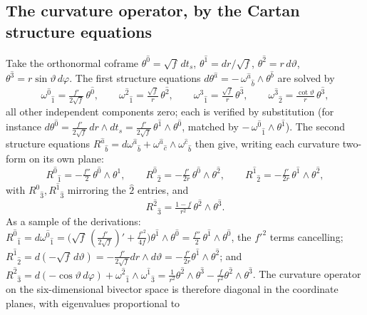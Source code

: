 \documentclass[11pt]{article}
\theoremstyle{definition}
\theoremstyle{plain}
\begin{document}
\subsection*{The curvature operator, by the Cartan structure equations}
\label{c:note.singularity.setting-curvature-operator-cartan-structure-equations}
Take the orthonormal coframe $\theta^{\hat 0} = \sqrt f\,dt_s$, $\theta^{\hat 1} = dr/\sqrt f$, $\theta^{\hat 2} = r\,d\vartheta$, $\theta^{\hat 3} = r\sin\vartheta\,d\varphi$. The first structure equations $d\theta^{\hat a} = -\,\omega^{\hat a}{}_{\hat b} \wedge \theta^{\hat b}$ are solved by
\[
\omega^{\hat 0}{}_{\hat 1} = \tfrac{f'}{2\sqrt f}\,\theta^{\hat 0}, \qquad
\omega^{\hat 2}{}_{\hat 1} = \tfrac{\sqrt f}{r}\,\theta^{\hat 2}, \qquad
\omega^{\hat 3}{}_{\hat 1} = \tfrac{\sqrt f}{r}\,\theta^{\hat 3}, \qquad
\omega^{\hat 3}{}_{\hat 2} = \tfrac{\cot\vartheta}{r}\,\theta^{\hat 3},
\]
all other independent components zero; each is verified by substitution (for instance $d\theta^{\hat 0} = \tfrac{f'}{2\sqrt f}\,dr \wedge dt_s = \tfrac{f'}{2\sqrt f}\,\theta^{\hat 1}\wedge\theta^{\hat 0}$, matched by $-\,\omega^{\hat 0}{}_{\hat 1}\wedge\theta^{\hat 1}$). The second structure equations $R^{\hat a}{}_{\hat b} = d\omega^{\hat a}{}_{\hat b} + \omega^{\hat a}{}_{\hat c}\wedge\omega^{\hat c}{}_{\hat b}$ then give, writing each curvature two-form on its own plane:
\[
R^{\hat 0}{}_{\hat 1} = -\tfrac{f''}{2}\,\theta^{\hat 0}\wedge\theta^{\hat 1}, \qquad
R^{\hat 0}{}_{\hat 2} = -\tfrac{f'}{2r}\,\theta^{\hat 0}\wedge\theta^{\hat 2}, \qquad
R^{\hat 1}{}_{\hat 2} = -\tfrac{f'}{2r}\,\theta^{\hat 1}\wedge\theta^{\hat 2},
\]
with $R^{\hat 0}{}_{\hat 3}, R^{\hat 1}{}_{\hat 3}$ mirroring the $\hat 2$ entries, and
\[
R^{\hat 2}{}_{\hat 3} = \tfrac{1 - f}{r^2}\,\theta^{\hat 2}\wedge\theta^{\hat 3} .
\]
As a sample of the derivations: $R^{\hat 0}{}_{\hat 1} = d\omega^{\hat 0}{}_{\hat 1} = \bigl(\sqrt f\,(\tfrac{f'}{2\sqrt f})' + \tfrac{f'^2}{4f}\bigr)\theta^{\hat 1}\wedge\theta^{\hat 0} = \tfrac{f''}{2}\,\theta^{\hat 1}\wedge\theta^{\hat 0}$, the $f'^2$ terms cancelling; $R^{\hat 1}{}_{\hat 2} = d(-\sqrt f\,d\vartheta) = -\tfrac{f'}{2\sqrt f}dr\wedge d\vartheta = -\tfrac{f'}{2r}\theta^{\hat 1}\wedge\theta^{\hat 2}$; and $R^{\hat 2}{}_{\hat 3} = d(-\cos\vartheta\,d\varphi) + \omega^{\hat 2}{}_{\hat 1}\wedge\omega^{\hat 1}{}_{\hat 3} = \tfrac{1}{r^2}\theta^{\hat 2}\wedge\theta^{\hat 3} - \tfrac{f}{r^2}\theta^{\hat 2}\wedge\theta^{\hat 3}$. The curvature operator on the six-dimensional bivector space is therefore diagonal in the coordinate planes, with eigenvalues proportional to
\end{document}
